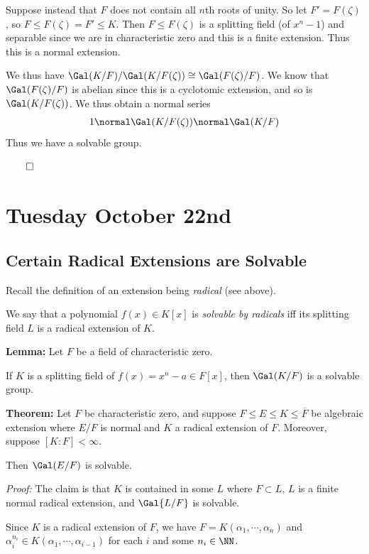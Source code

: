 Suppose instead that \(F\) does not contain all \(n\)th roots of unity.
So let \(F' = F(\zeta)\), so \(F \leq F(\zeta) = F' \leq K\). Then
\(F \leq F(\zeta)\) is a splitting field (of \(x^n-1\)) and separable
since we are in characteristic zero and this is a finite extension. Thus
this is a normal extension.

We thus have \(\Gal(K/F) / \Gal(K/F(\zeta)) \cong \Gal(F(\zeta)/ F)\).
We know that \(\Gal(F(\zeta)/ F)\) is abelian since this is a cyclotomic
extension, and so is \(\Gal(K/F(\zeta))\). We thus obtain a normal
series
\begin{align*}
1 \normal \Gal(K/F(\zeta)) \normal \Gal(K/F)
\end{align*} Thus we have a solvable group.

\(\qed\)

\hypertarget{tuesday-october-22nd}{%
\section{Tuesday October 22nd}\label{tuesday-october-22nd}}

\hypertarget{certain-radical-extensions-are-solvable}{%
\subsection{Certain Radical Extensions are
Solvable}\label{certain-radical-extensions-are-solvable}}

Recall the definition of an extension being \emph{radical} (see above).

We say that a polynomial \(f(x) \in K[x]\) is \emph{solvable by
radicals} iff its splitting field \(L\) is a radical extension of \(K\).

\textbf{Lemma:} Let \(F\) be a field of characteristic zero.

If \(K\) is a splitting field of \(f(x) = x^n - a \in F[x]\), then
\(\Gal(K/F)\) is a solvable group.

\textbf{Theorem:} Let \(F\) be characteristic zero, and suppose
\(F \leq E \leq K \leq \overline F\) be algebraic extension where
\(E/F\) is normal and \(K\) a radical extension of \(F\). Moreover,
suppose \([K:F] < \infty\).

Then \(\Gal(E/F)\) is solvable.

\emph{Proof:} The claim is that \(K\) is contained in some \(L\) where
\(F \subset L\), \(L\) is a finite normal radical extension, and
\(\Gal{L/F}\) is solvable.

Since \(K\) is a radical extension of \(F\), we have
\(F = K(\alpha_1, \cdots, \alpha_n)\) and
\(\alpha_i^{n_i} \in K(\alpha_1, \cdots, \alpha_{i-1})\) for each \(i\)
and some \(n_i \in \NN\).

